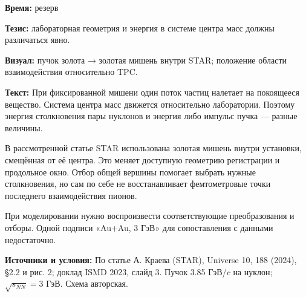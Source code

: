 \textbf{Время:} резерв

\textbf{Тезис:} лабораторная геометрия и энергия в системе центра масс должны различаться явно.

\textbf{Визуал:} пучок золота → золотая мишень внутри STAR; положение области взаимодействия относительно TPC.

\textbf{Текст:} При фиксированной мишени один поток частиц налетает на покоящееся вещество. Система центра масс движется относительно лаборатории. Поэтому энергия столкновения пары нуклонов и энергия либо импульс пучка — разные величины.

В рассмотренной статье STAR использована золотая мишень внутри установки, смещённая от её центра. Это меняет доступную геометрию регистрации и продольное окно. Отбор общей вершины помогает выбрать нужные столкновения, но сам по себе не восстанавливает фемтометровые точки последнего взаимодействия пионов.

При моделировании нужно воспроизвести соответствующие преобразования и отборы. Одной подписи «Au+Au, 3 ГэВ» для сопоставления с данными недостаточно.

\textbf{Источники и условия:} По статье А. Краева (STAR), Universe 10, 188 (2024), §2.2 и рис. 2; доклад ISMD 2023, слайд 3. Пучок 3.85 ГэВ/\(c\) на нуклон; \(\sqrt{s_{NN}}=3\) ГэВ. Схема авторская.
